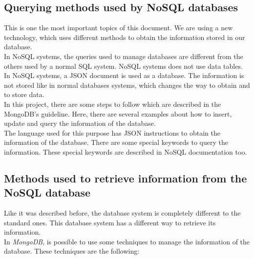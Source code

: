 \subsection{Querying methods used by NoSQL databases}

This is one the most important topics of this document. We are using a new technology, which uses different methods to obtain the information stored in our database.\\

In NoSQL systems, the queries used to manage databases are different from the others used by a normal SQL system. NoSQL systems does not use data tables. In NoSQL systems, a JSON document is used as a database. The information is not stored like in normal databases systems, which changes the way to obtain and to store data.\\

In this project, there are some steps to follow which are described in the MongoDB's guideline. Here, there are several examples about how to insert, update and query the information of the database.\\

The language used for this purpose has JSON instructions to obtain the information of the database. There are some special keywords to query the information. These special keywords are described in NoSQL documentation too.

\subsection{Methods used to retrieve information from the NoSQL database}

Like it was described before, the database system is completely different to the standard ones. This database system has a different way to retrieve its information.\\

In \textit{MongoDB}, is possible to use some techniques to manage the information of the database. These techniques are the following:

